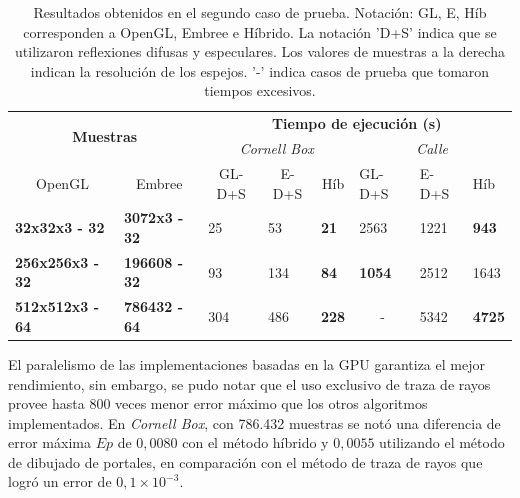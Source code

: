 \begin{table}[htbp!]
	\centering
	\begin{tabular}{|l|l|l|l|l||l|l|l|}
		\hline
		\multicolumn{2}{|c|}{\multirow{2}{*}{\textbf{Muestras}}} & \multicolumn{6}{c|}{\textbf{Tiempo de ejecución (s)}}                                                                                  \\ \cline{3-8} 
		\multicolumn{2}{|c|}{}                   & \multicolumn{3}{c||}{\textit{Cornell Box}}                 & \multicolumn{3}{c|}{\textit{Calle}}                      \\ \cline{1-8}
		\multicolumn{1}{|c|}{OpenGL} &\multicolumn{1}{c|}{Embree} & \multicolumn{1}{c|}{GL-D+S} & \multicolumn{1}{c|}{E-D+S} & \multicolumn{1}{c||}{Híb} & GL-D+S                 & E-D+S & Híb \\ \hline
		\textbf{32x32x3 - 32}                                &
		\textbf{3072x3 - 32}                                & 25                         & 53                          & \textbf{21}                           & 2563                   & 1221   & \textbf{943}     \\ \hline
		\textbf{256x256x3 - 32}                                &
		\textbf{196608 - 32}                               & 93                         & 134                         & \textbf{84}                          & \textbf{1054}                   & 2512   & 1643    \\ \hline
		\textbf{512x512x3 - 64} &\textbf{786432 - 64}                              & 304                        & 486                         & \textbf{228}                          & \multicolumn{1}{c|}{-} & 5342   & \textbf{4725}    \\ \hline
	\end{tabular}
	\caption{Resultados obtenidos en el segundo caso de prueba. Notación: GL, E, Híb corresponden a OpenGL, Embree e Híbrido. La notación 'D+S' indica que se utilizaron reflexiones difusas y especulares. Los valores de muestras a la derecha indican la resolución de los espejos. '-' indica casos de prueba que tomaron tiempos excesivos.}
	\label{tab:caso2}
\end{table}

El paralelismo de las implementaciones basadas en la GPU garantiza el mejor rendimiento, sin embargo, se pudo notar que el uso exclusivo de traza de rayos provee hasta 800 veces menor error máximo que los otros algoritmos implementados. En \textit{Cornell Box}, con 786.432 muestras se notó una diferencia de error máxima $Ep$ de $0,0080$ con el método híbrido y $0,0055$ utilizando el método de dibujado de portales, en comparación con el método de traza de rayos que logró un error de $0,1 \times 10^{-3}$.

